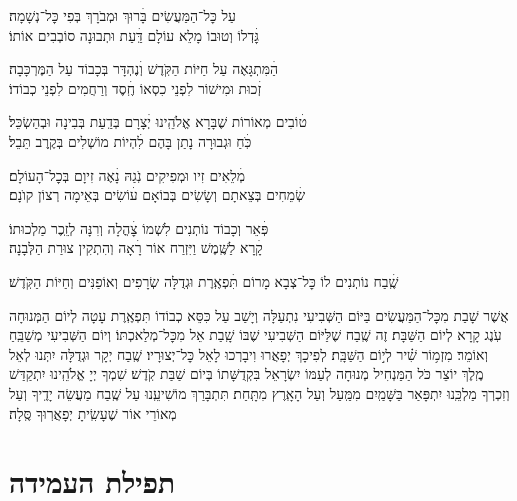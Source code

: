 \documentclass[twoside, openany, parskip=half, 11pt]{book}
\begin{document}
עַל כׇּל־הַמַּעֲשִׂים \hfill בָּׄרוּךְ וּמְבֹרָךְ בְּפִי כׇּל־נְשָׁמָה׃ \\
גׇּׄדְלוֹ וְטוּבוֹ מָלֵא עוֹלָם \hfill דַּֽׄעַת וּתְבוּנָה סוֹבְבִים אוֹתוֹ׃

הַׄמִּתְגָּאֶה עַל חַיּוֹת הַקֹּֽדֶשׁ \hfill וְׄנֶהְדָּר בְּכָבוֹד עַל הַמֶּרְכָּבָה׃\\
זְׄכוּת וּמִישׁוֹר לִפְנֵי כִסְאוֹ \hfill חֶֽׄסֶד וְרַחֲמִים לִפְנֵי כְבוֹדוֹ׃

טׄוֹבִים מְאוֹרוֹת שֶׁבָּרָא אֱלֹהֵֽינוּ \hfill יְׄצָרָם בְּדַֽעַת בְּבִינָה וּבְהַשְׂכֵּל׃\\
כֹּֽׄחַ וּגְבוּרָה נָתַן בָּהֶם \hfill לִׄהְיוֹת מוֹשְׁלִים בְּקֶֽרֶב תֵּבֵל׃

מְׄלֵאִים זִיו וּמְפִיקִים נֹֽגַהּ \hfill נָׄאֶה זִיוָם בְּכׇל־הָעוֹלָם׃ \\
שְׂׄמֵחִים בְּצֵאתָם וְשָׂשִׂים בְּבוֹאָם \hfill עׄוֹשִׂים בְּאֵימָה רְצוֹן קוׂנָם׃

פְּׄאֵר וְכָבוֹד נוֹתְנִים לִשְׁמוֹ \hfill צׇׄהֳלָה וְרִנָּה לְזֵֽכֶר מַלְכוּתוֹ׃ \\
קָׄרָא לַשֶּֽׁמֶשׁ וַיִּזְרַח אוֹר \hfill רָׄאָה וְהִתְקִין צוּרַת הַלְּבָנָה׃

שֶֽׁׄבַח נוֹתְנִים לוֹ כׇּל־צְבָא מָרוֹם \hfill תִּׄפְאֶֽרֶת וּגְדֻלָּה שְׂרָפִים וְאוֹפַנִּים וְחַיּוֹת הַקֹּֽדֶשׁ׃

אֲשֶׁר שָׁבַת מִכׇּל־הַמַּעֲשִׂים בַּיּוֹם הַשְּׁבִיעִי נִתְעַלָּה וְיָשַׁב עַל כִּסֵּא כְבוֹדוֹ תִּפְאֶֽרֶת עָטָה לְיוֹם הַמְּנוּחָה עֹֽנֶג קָרָא לְיוֹם הַשַּׁבָּת׃ זֶה שֶֽׁבַח שֶׁלַּיּוֹם הַשְּׁבִיעִי שֶׁבּוֹ שָֽׁבַת אֵל מִכׇּל־מְלַאכְתּוֹ׃ וְיוֹם הַשְּׁבִיעִי מְשַׁבֵּֽחַ וְאוֹמֵר׃
%
מִזְמ֥וֹר שִׁ֗יר לְי֣וֹם הַשַּׁבָּֽת׃
לְפִיכָךְ יְפָאֲרוּ וִיבָרְכוּ לָאֵל כׇּל־יְצוּרָיו׃ שֶֽׁבַח יְקָר וּגְדֻלָּה יִתְּנוּ לְאֵל מֶֽלֶךְ יוֹצֵר כֹּל הַמַּנְחִיל מְנוּחָה לְעַמּוֹ יִשְׂרָאֵל בִּקְדֻשָּׁתוֹ בְּיוֹם שַׁבַּת קֹֽדֶשׁ׃ שִׁמְךָ יְיָ אֱלֹהֵֽינוּ יִתְקַדַּשׁ וְזִכְרְךָ מַלְכֵּֽנוּ יִתְפָּאַר בַּשָּׁמַֽיִם מִמַּֽעַל וְעַל הָאָֽרֶץ מִתָּֽחַת׃ תִּתְבָּרַךְ מוֹשִׁיעֵֽנוּ עַל שֶֽׁבַח מַעֲשֵׂה יָדֶֽיךָ וְעַל מְאוֹרֵי אוֹר שֶׁעָשִֽׂיתָ יְפָאֲרֽוּךָ סֶּֽלָה׃


\label{tisbarach}
\yotzerhameoros

\ahavaraba

\shema

\veahavta

\vehaya

\vayomer{}

\emesveyatziv

\ezrasavoseinu

\gaalyisroel

\nextpage


\section[תפילת העמידה]{ תפילת העמידה }
\end{document}
